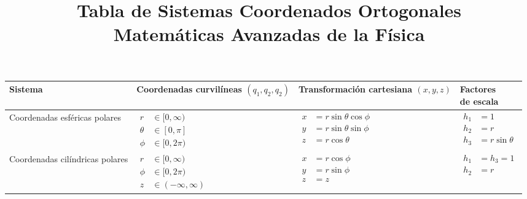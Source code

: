 \documentclass[12pt,landscape]{article}
\title{Tabla de Sistemas Coordenados Ortogonales \\ {\large Matemáticas Avanzadas de la Física}}
\date{ }
\numberwithin{equation}{section}
\begin{document}
\renewcommand\labelenumii{\theenumi.{\arabic{enumii}}}
\maketitle
\fontsize{14}{14}\selectfont
{\renewcommand{\arraystretch}{4}%
\begin{tabular}{| l | p{5cm} | l | p{5cm} |}
\hline
Sistema & \makecell{Coordenadas \\ curvilíneas \\ $(q_{1}, q_{2}, q_{2})$} & \makecell{Transformación cartesiana \\ $(x, y,z)$} & \makecell{Factores \\ de escala} \\ \hline
Coordenadas esféricas polares & 
$\!\begin{aligned}
r &\in [0, \infty) \\
\theta &\in [0, \pi] \\
\phi &\in [0,2\pi)
\end{aligned}$ & $\!\begin{aligned} 
x &= r \sin \theta \cos \phi \\ 
y &= r \sin \theta \sin \phi \\
z &= r \cos \theta
\end{aligned}$ & 
$\!\begin{aligned} %
h_{1} &= 1 \\
h_{2} &= r \\
h_{3} &= r \sin \theta
\end{aligned}$ \\ \hline
Coordenadas cilíndricas polares & $\!\begin{aligned}
r &\in[0,\infty) \\
\phi &\in [0,2\pi) \\
z &\in (-\infty,\infty) 
\end{aligned}$ &
$\!\begin{aligned}
x &= r \cos \phi \\
y &= r \sin \phi \\
z &= z
\end{aligned}$ &
$\!\begin{aligned}
h_{1 }&= h_{3} = 1 \\
h_{2} &= r
\end{aligned}$ \\ \hline
\end{tabular}}
\end{document}
